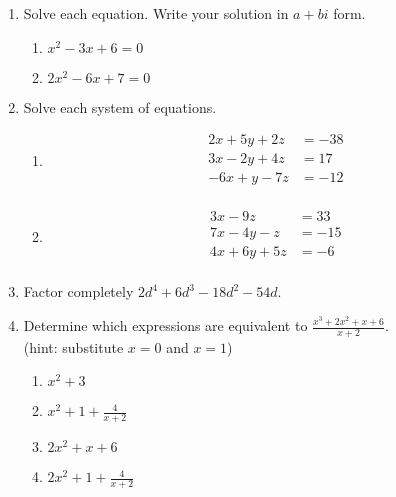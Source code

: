 \documentclass[12pt, twoside]{article}
\begin{document}
\begin{enumerate}[itemsep=0.5cm]
\item Solve each equation. Write your solution in $a+bi$ form.
\begin{multicols}{2}
\begin{enumerate}[itemsep=0.5cm]
    \item $x^2-3x+6=0$
    \item $2x^2-6x+7=0$
\end{enumerate}
\end{multicols} \vspace{4cm}

\item Solve each system of equations.
\begin{multicols}{2}
    \begin{enumerate}
        \item 
        \begin{align*}
            2x+5y +2z &= -38 \\
            3x-2y +4z &= 17 \\
            -6x +y -7z &= -12 \\
        \end{align*}
        \item 
        \begin{align*}
            3x -9z &= 33 \\
            7x-4y -z &= -15 \\
            4x+6y +5z &= -6 \\
        \end{align*}
    \end{enumerate}
\end{multicols}

\newpage
\item Factor completely $2d^4+6d^3-18d^2-54d$. \vspace{4cm}

\item Determine which expressions are equivalent to $\displaystyle \frac{x^3+2x^2+x+6}{x+2}$. \\[0.25cm]
    (hint: substitute $x=0$ and $x=1$)
    \begin{multicols}{2}
    \begin{enumerate}
        \item $x^2+3$
        \item $\displaystyle x^2+1 +\frac{4}{x+2}$
        \item $2x^2+x+6$
        \item $\displaystyle 2x^2+1 + \frac{4}{x+2}$
    \end{enumerate}
    \end{multicols} \vspace{3cm}


\end{enumerate}
\end{document}
